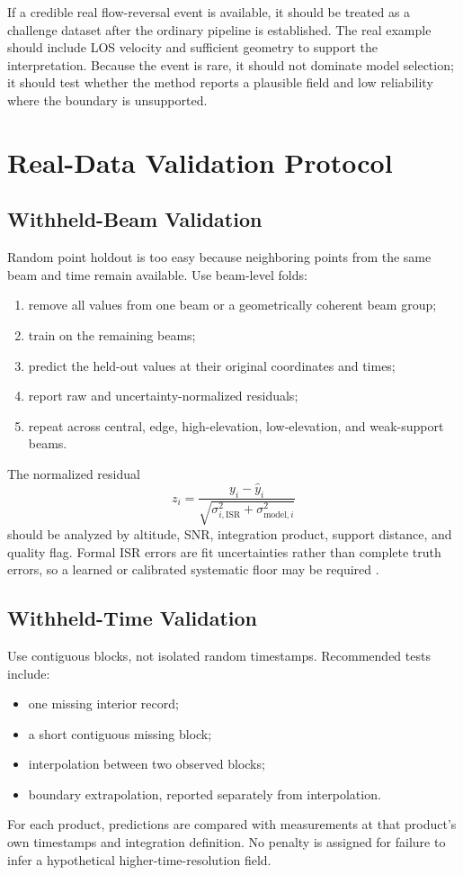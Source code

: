 \documentclass[11pt]{article}
\begin{document}
If a credible real flow-reversal event is available, it should be treated as a challenge dataset after the
ordinary pipeline is established. The real example should include LOS velocity and sufficient geometry to
support the interpretation. Because the event is rare, it should not dominate model selection; it should
test whether the method reports a plausible field and low reliability where the boundary is unsupported.

\section{Real-Data Validation Protocol}

\subsection{Withheld-Beam Validation}

Random point holdout is too easy because neighboring points from the same beam and time remain available.
Use beam-level folds:
\begin{enumerate}
  \item remove all values from one beam or a geometrically coherent beam group;
  \item train on the remaining beams;
  \item predict the held-out values at their original coordinates and times;
  \item report raw and uncertainty-normalized residuals;
  \item repeat across central, edge, high-elevation, low-elevation, and weak-support beams.
\end{enumerate}

The normalized residual
\begin{equation}
  z_i = \frac{y_i-\widehat y_i}{\sqrt{\sigma_{i,\mathrm{ISR}}^2+\sigma_{\mathrm{model},i}^2}}
\end{equation}
should be analyzed by altitude, SNR, integration product, support distance, and quality flag. Formal ISR errors
are fit uncertainties rather than complete truth errors, so a learned or calibrated systematic floor may be
required \cite{Diaz2026ISRError}.

\subsection{Withheld-Time Validation}

Use contiguous blocks, not isolated random timestamps. Recommended tests include:
\begin{itemize}
  \item one missing interior record;
  \item a short contiguous missing block;
  \item interpolation between two observed blocks;
  \item boundary extrapolation, reported separately from interpolation.
\end{itemize}
For each product, predictions are compared with measurements at that product's own timestamps and integration
definition. No penalty is assigned for failure to infer a hypothetical higher-time-resolution field.
\end{document}
